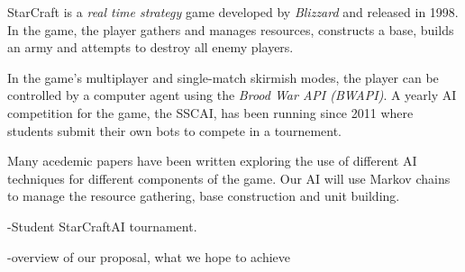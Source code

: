 StarCraft is a \textit{real time strategy} game developed by \textit{Blizzard} and released in 1998. In the game, the player gathers and manages resources, constructs a base, builds an army and attempts to destroy all enemy players.  

In the game's multiplayer and single-match skirmish modes, the player can be controlled by a computer agent using the \textit{Brood War API (BWAPI)}. A yearly AI competition for the game, the SSCAI, has been running since 2011 where students submit their own bots to compete in a tournement.

Many acedemic papers have been written exploring the use of different AI techniques for different components of the game. Our AI will use Markov chains to manage the resource gathering, base construction and unit building.



-Student StarCraftAI tournament.

-overview of our proposal, what we hope to achieve
